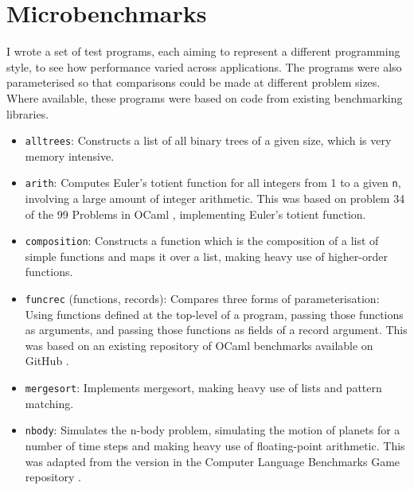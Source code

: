 \newpage
\section{Microbenchmarks}
I wrote a set of test programs, each aiming to represent a different programming style, to see how performance varied across applications. The programs were also parameterised so that comparisons could be made at different problem sizes. %
Where available, these programs were based on code from existing benchmarking libraries.

\begin{itemize}
\item \verb|alltrees|: Constructs a list of all binary trees of a given size, which is very memory intensive. %

\item \verb|arith|: Computes Euler's totient function for all integers from 1 to a given \verb|n|, involving a large amount of integer arithmetic. This was based on problem 34 of the 99 Problems in OCaml \cite{99-problems}, implementing Euler's totient function.

\item \verb|composition|: Constructs a function which is the composition of a list of simple functions and maps it over a list, making heavy use of higher-order functions.

\item \verb|funcrec| (functions, records): Compares three forms of parameterisation: Using functions defined at the top-level of a program, passing those functions as arguments, and passing those functions as fields of a record argument. This was based on an existing repository of OCaml benchmarks available on GitHub \cite{chris00}.

\item \verb|mergesort|: Implements mergesort, making heavy use of lists and pattern matching.

\item \verb|nbody|: Simulates the n-body problem, simulating the motion of planets for a number of time steps and making heavy use of floating-point arithmetic. This was adapted from the version in the Computer Language Benchmarks Game repository \cite{benchmark-game}.
\end{itemize}

